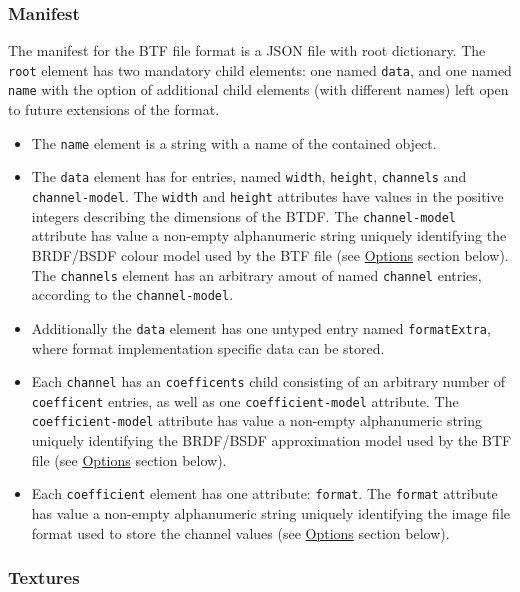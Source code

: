 \hypertarget{manifest}{%
\subsubsection{Manifest}\label{manifest}}

The manifest for the BTF file format is a JSON file with root
dictionary. The \texttt{root} element has two mandatory child elements:
one named \texttt{data}, and one named \texttt{name} with the option of
additional child elements (with different names) left open to future
extensions of the format.
\begin{itemize}
\item The \texttt{name} element is a string with a
name of the contained object.
\item The \texttt{data} element has for
entries, named \texttt{width}, \texttt{height}, \texttt{channels} and
\texttt{channel-model}. The \texttt{width} and \texttt{height}
attributes have values in the positive integers describing the
dimensions of the BTDF. The \texttt{channel-model} attribute has value a
non-empty alphanumeric string uniquely identifying the BRDF/BSDF colour
model used by the BTF file (see \protect\hyperlink{Options}{Options}
section below). The \texttt{channels} element has an arbitrary amout of
named \texttt{channel} entries, according to the \texttt{channel-model}.
\item Additionally the \texttt{data} element has one untyped entry named
\texttt{formatExtra}, where format implementation specific data can be
stored.
\item Each \texttt{channel} has an \texttt{coefficents} child
consisting of an arbitrary number of \texttt{coefficent} entries, as
well as one \texttt{coefficient-model} attribute. The
\texttt{coefficient-model} attribute has value a non-empty alphanumeric
string uniquely identifying the BRDF/BSDF approximation model used by
the BTF file (see \protect\hyperlink{Options}{Options} section below).
\item Each \texttt{coefficient} element has one attribute: \texttt{format}.
The \texttt{format} attribute has value a non-empty alphanumeric string
uniquely identifying the image file format used to store the channel
values (see \protect\hyperlink{Options}{Options} section below).
\end{itemize}

\hypertarget{textures}{%
\subsubsection{Textures}\label{textures}}

